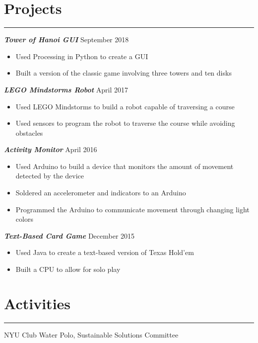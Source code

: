 \documentclass[line, margin]{res}
\begin{document}
\begin{resume}
\section{Projects}
\vspace{.3em}
\hspace{-9.8em}
\rule{6.5in}{0.5pt}
\textit{\upshape \textbf{Tower of Hanoi GUI}} \hfill September 2018\\ 
\begin{itemize}[noitemsep,nolistsep]
\item Used Processing in Python to create a GUI
\item Built a version of the classic game involving three towers and ten disks
\end{itemize}
\textit{\upshape \textbf{LEGO Mindstorms Robot}} \hfill April 2017\\ 
\begin{itemize}[noitemsep,nolistsep]
\item Used LEGO Mindstorms to build a robot capable of traversing a course
\item Used sensors to program the robot to traverse the course while avoiding obstacles
\end{itemize}
\textit{\upshape \textbf{Activity Monitor}} \hfill April 2016\\ 
\begin{itemize}[noitemsep,nolistsep]
\item Used Arduino to build a device that monitors the amount of movement detected by the device
\item Soldered an accelerometer and indicators to an Arduino 
\item Programmed the Arduino to communicate movement through changing light colors
\end{itemize}
\textit{\upshape \textbf{Text-Based Card Game}} \hfill December 2015\\ 
\begin{itemize}[noitemsep,nolistsep]
\item Used Java to create a text-based version of Texas Hold’em
\item Built a CPU to allow for solo play
\end{itemize}
                                                                        
\section{Activities}
\vspace{.3em}
\hspace{-9.8em}
\rule{6.5in}{0.5pt}
NYU Club Water Polo, Sustainable Solutions Committee

\end{resume}
\end{document}
